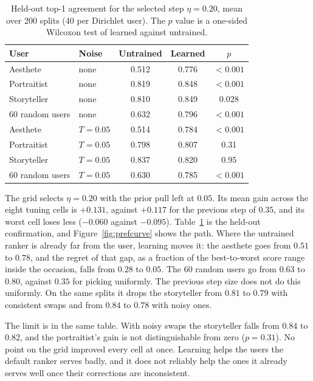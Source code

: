 \documentclass[conference]{IEEEtran}
\begin{document}
\begin{table}[t]
\caption{Held-out top-1 agreement for the selected step $\eta{=}0.20$, mean
over 200 splits (40 per Dirichlet user). The $p$ value is a one-sided Wilcoxon
test of learned against untrained.}
\label{tab:pref}
\centering
\scriptsize
\begin{tabular}{@{}llccc@{}}
\toprule
User & Noise & Untrained & Learned & $p$ \\
\midrule
Aesthete & none & 0.512 & 0.776 & ${<}0.001$ \\
Portraitist & none & 0.819 & 0.848 & ${<}0.001$ \\
Storyteller & none & 0.810 & 0.849 & 0.028 \\
60 random users & none & 0.632 & 0.796 & ${<}0.001$ \\
Aesthete & $T{=}0.05$ & 0.514 & 0.784 & ${<}0.001$ \\
Portraitist & $T{=}0.05$ & 0.798 & 0.807 & 0.31 \\
Storyteller & $T{=}0.05$ & 0.837 & 0.820 & 0.95 \\
60 random users & $T{=}0.05$ & 0.630 & 0.785 & ${<}0.001$ \\
\bottomrule
\end{tabular}
\end{table}

The grid selects $\eta=0.20$ with the prior pull left at $0.05$. Its mean gain
across the eight tuning cells is $+0.131$, against $+0.117$ for the previous
step of $0.35$, and its worst cell loses less ($-0.060$ against $-0.095$).
Table~\ref{tab:pref} is the held-out confirmation, and
Figure~\ref{fig:prefcurve} shows the path. Where the untrained ranker is
already far from the user, learning moves it: the aesthete goes from $0.51$ to
$0.78$, and the regret of that gap, as a fraction of the best-to-worst score
range inside the occasion, falls from $0.28$ to $0.05$. The 60 random users
go from $0.63$ to $0.80$, against $0.35$ for picking uniformly. The previous
step size does not do this uniformly. On the same splits it drops the
storyteller from $0.81$ to $0.79$ with consistent swaps and from $0.84$ to
$0.78$ with noisy ones.

The limit is in the same table. With noisy swaps the storyteller falls from
$0.84$ to $0.82$, and the portraitist's gain is not distinguishable from zero
($p=0.31$). No point on the grid improved every cell at once. Learning helps
the users the default ranker serves badly, and it does not reliably help the
ones it already serves well once their corrections are inconsistent.
\end{document}
